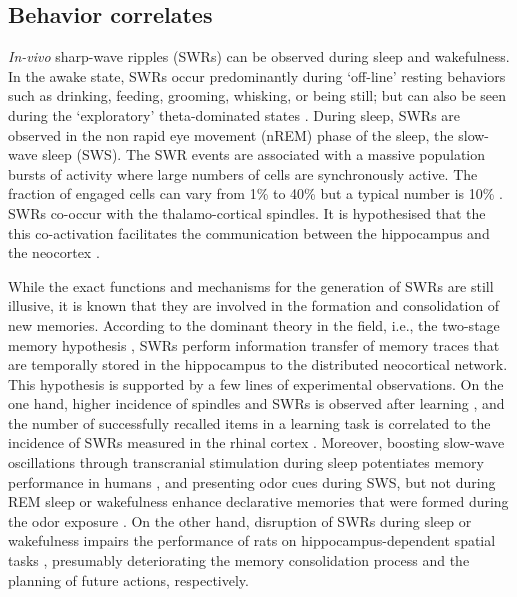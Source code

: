   \subsection{Behavior correlates}
    {\it In-vivo} sharp-wave ripples (SWRs) can be observed during sleep and
    wakefulness. In the awake state, SWRs occur predominantly during `off-line'
    resting behaviors such as drinking, feeding, grooming, whisking, or being
    still; but can also be seen during the `exploratory' theta-dominated states
    \citep{Oneill2006}. During sleep, SWRs are observed in the non rapid eye
    movement (nREM) phase of the sleep, the slow-wave sleep (SWS). The SWR
    events are associated with a massive population bursts of activity where
    large numbers of cells are synchronously active. The fraction of engaged
    cells can vary from 1\% to 40\% but a typical number is 10\%
    \citep{Mizuseki2013}. SWRs co-occur with the thalamo-cortical spindles. It
    is hypothesised that the this co-activation facilitates the communication
    between the hippocampus and the neocortex \citep{Sirota2003}.
    
    While the exact functions and mechanisms for the generation of SWRs are
    still illusive, it is known that they are involved in the formation and
    consolidation of new memories. According to the dominant theory in the
    field, i.e., the two-stage memory hypothesis \citep{Buzsaki1989}, SWRs
    perform information transfer of memory traces that are temporally stored in
    the hippocampus to the distributed neocortical network. This hypothesis is
    supported by a few lines of experimental observations. On the one hand,
    higher incidence of spindles and SWRs is observed after learning
    \citep{Eschenko2006, Eschenko2008, Girardeau2014}, and the number of
    successfully recalled items in a learning task is correlated to the
    incidence of SWRs measured in the rhinal cortex
    \citep{Axmacher2008}. Moreover, boosting slow-wave oscillations through
    transcranial stimulation during sleep potentiates memory performance in
    humans \citep{Marshall2006}, and presenting odor cues during SWS, but not
    during REM sleep or wakefulness enhance declarative memories that were
    formed during the odor exposure \citep{Rasch2007}. On the other hand,
    disruption of SWRs during sleep or wakefulness impairs the performance of
    rats on hippocampus-dependent spatial tasks \citep{Girardeau2009,
    Jadhav2012}, presumably deteriorating the memory consolidation process and
    the planning of future actions, respectively.


